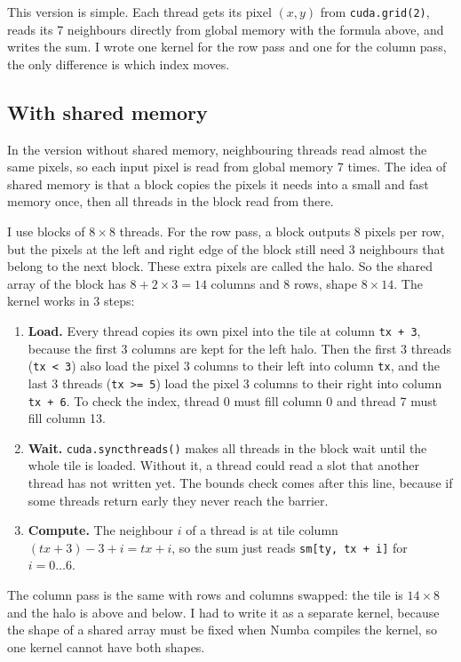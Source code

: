 \documentclass[11pt]{article}
\begin{document}
This version is simple. Each thread gets its pixel $(x, y)$ from \texttt{cuda.grid(2)}, reads its 7 neighbours directly from global memory with the formula above, and writes the sum. I wrote one kernel for the row pass and one for the column pass, the only difference is which index moves.

\subsection{With shared memory}

In the version without shared memory, neighbouring threads read almost the same pixels, so each input pixel is read from global memory 7 times. The idea of shared memory is that a block copies the pixels it needs into a small and fast memory once, then all threads in the block read from there.

I use blocks of $8 \times 8$ threads. For the row pass, a block outputs 8 pixels per row, but the pixels at the left and right edge of the block still need 3 neighbours that belong to the next block. These extra pixels are called the halo. So the shared array of the block has $8 + 2 \times 3 = 14$ columns and 8 rows, shape $8 \times 14$. The kernel works in 3 steps:

\begin{enumerate}
    \item \textbf{Load.} Every thread copies its own pixel into the tile at column \texttt{tx + 3}, because the first 3 columns are kept for the left halo. Then the first 3 threads (\texttt{tx < 3}) also load the pixel 3 columns to their left into column \texttt{tx}, and the last 3 threads (\texttt{tx >= 5}) load the pixel 3 columns to their right into column \texttt{tx + 6}. To check the index, thread 0 must fill column 0 and thread 7 must fill column 13.
    \item \textbf{Wait.} \texttt{cuda.syncthreads()} makes all threads in the block wait until the whole tile is loaded. Without it, a thread could read a slot that another thread has not written yet. The bounds check comes after this line, because if some threads return early they never reach the barrier.
    \item \textbf{Compute.} The neighbour $i$ of a thread is at tile column $(tx + 3) - 3 + i = tx + i$, so the sum just reads \texttt{sm[ty, tx + i]} for $i = 0 \dots 6$.
\end{enumerate}

The column pass is the same with rows and columns swapped: the tile is $14 \times 8$ and the halo is above and below. I had to write it as a separate kernel, because the shape of a shared array must be fixed when Numba compiles the kernel, so one kernel cannot have both shapes.
\end{document}
